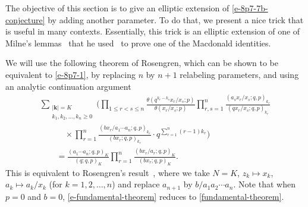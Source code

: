 \documentclass[pdftex]{sigma}
\numberwithin{equation}{section}
\newcommand\sumk{{\left| \boldsymbol{k} \right|}}
\newcommand{\triprod}[1]{\prod\limits_{1\le r < s \le #1}}
\newcommand{\sqprod}[1]{\prod\limits_{r, s =1}^{#1}} %
\newcommand{\smallprod}[1]{\prod\limits_{r =1}^{#1}} %
\newcommand{\xover}[1]{#1_{r}/#1_{s}}
\newcommand{\ellipticqrfac}[2]{{\left({#1}; q, p\right)_{#2}}} %
\newcommand{\elliptictheta}[1]{\theta \left({#1} ; p\right) }
\newcommand{\ellipticvandermonde}[3]{\triprod{#3} %
\!\! \frac{\elliptictheta{q^{#2_r-#2_s} \xover {#1} }}{\elliptictheta{\xover{#1}}}
}
\begin{document}
The objective of this section is to give an elliptic extension of \eqref{e-8p7-7b-conjecture} by adding another parameter. To do that, we present a nice trick that is useful in many contexts. Essentially, this trick is an elliptic extension of one of Milne's lemmas~\cite[Lemma~7.3]{Milne1997} that he used~\cite{Milne1985} to prove one of the Macdonald identities.

We will use the following theorem of Rosengren, which can be shown to be equivalent to \eqref{e-8p7-1}, by replacing $n$ by $n+1$ relabeling parameters, and using an analytic continuation argument
\begin{gather}
\sum\limits_{\substack{\sumk = K \\
k_1,k_2, \dots, k_n\geq 0} } \Bigg( \ellipticvandermonde{x}{k}{n}
\sqprod n \frac{\ellipticqrfac{a_s\xover{x}}{k_r} }{\ellipticqrfac{q\xover{x}}{k_r} } \nonumber\\
\qquad\quad{} \times
\smallprod n \frac{\ellipticqrfac{bx_r/a_1\cdots a_n}{k_r}}{\ellipticqrfac{bx_r}{k_r} }\cdot q^{\sum\limits_{r=1}^n (r-1)k_r}\Bigg)\nonumber\\
\qquad{} = \frac{\ellipticqrfac{a_1\cdots a_n}{K}}{\ellipticqrfac{q}{K}}
\smallprod n \frac{\ellipticqrfac{bx_r/a_r}{K}}{\ellipticqrfac{bx_r}{K} } .\label{e-fundamental-theorem}
\end{gather}
This is equivalent to Rosengren's result~\cite[Theorem~5.1]{HR2004}, where we take $N=K$, $z_k\mapsto x_k$, $a_k\mapsto a_k/x_k$ (for $k=1, 2, \dots, n$) and replace $a_{n+1}$ by $b/a_1a_2\cdots a_n$. Note that when $p=0$ and $b=0$, \eqref{e-fundamental-theorem} reduces to \eqref{fundamental-theorem}.
\end{document}
